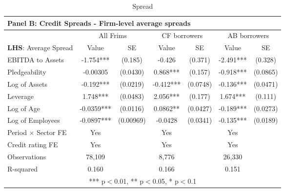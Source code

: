 \documentclass[12pt]{article}
\begin{document}
\begin{table}[H]
{\begin{tabular}{lcccccc}
    \multicolumn{7}{l}{Panel B: \textbf{Credit Spreads - Firm-level average spreads}} \\    
    \toprule
    & \multicolumn{2}{c}{All Frims} & \multicolumn{2}{c}{CF borrowers} & \multicolumn{2}{c}{AB borrowers} \\
    \cmidrule(lr){2-3} \cmidrule(lr){4-5} \cmidrule(lr){6-7}
    \textbf{LHS}: Average Spread & Value & SE & Value & SE & Value & SE \\
    \midrule
    EBITDA to Assets & -1.754*** & (0.185) & -0.426 & (0.371) & -2.491*** & (0.328) \\
    Pledgeability & -0.00305 & (0.0430) & 0.868*** & (0.157) & -0.918*** & (0.0865) \\
    Log of Assets & -0.192*** & (0.0219) & -0.412*** & (0.0748) & -0.136*** & (0.0471) \\
    Leverage & 1.748*** & (0.0483) & 2.056*** & (0.177) & 1.674*** & (0.111) \\
    Log of Age & -0.0359*** & (0.0116) & 0.0862** & (0.0427) & -0.189*** & (0.0273) \\
    Log of Employees & -0.0897*** & (0.00969) & -0.0428 & (0.0341) & -0.135*** & (0.0189) \vspace{2mm} \\
    \midrule
    Period $\times$ Sector FE & Yes & & Yes & & Yes & \\
    Credit rating FE & Yes & & Yes & & Yes & \\
    Observations & 78,109 & & 8,776 & & 26,330 & \\
    R-squared & 0.160 & & 0.166 & & 0.151 & \\
    \bottomrule
    \multicolumn{7}{c}{*** p$<$0.01, ** p$<$0.05, * p$<$0.1} \\
    \end{tabular}%
    }
    \caption{Spread}
\end{table}
\end{document}
